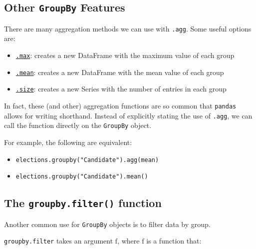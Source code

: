 \documentclass[
  letterpaper,
  DIV=11,
  numbers=noendperiod]{scrreprt}
\providecommand{\tightlist}{%
  \setlength{\itemsep}{0pt}\setlength{\parskip}{0pt}}\usepackage{longtable,booktabs,array}
\begin{document}
\hypertarget{other-groupby-features}{%
\subsection{\texorpdfstring{Other \texttt{GroupBy}
Features}{Other GroupBy Features}}\label{other-groupby-features}}

There are many aggregation methods we can use with \texttt{.agg}. Some
useful options are:

\begin{itemize}
\tightlist
\item
  \href{https://pandas.pydata.org/pandas-docs/stable/reference/api/pandas.core.groupby.GroupBy.max.html}{\texttt{.max}}:
  creates a new DataFrame with the maximum value of each group
\item
  \href{https://pandas.pydata.org/pandas-docs/stable/reference/api/pandas.core.groupby.GroupBy.mean.html}{\texttt{.mean}}:
  creates a new DataFrame with the mean value of each group
\item
  \href{https://pandas.pydata.org/pandas-docs/stable/reference/api/pandas.core.groupby.GroupBy.size.html}{\texttt{.size}}:
  creates a new Series with the number of entries in each group
\end{itemize}

In fact, these (and other) aggregation functions are so common that
\texttt{pandas} allows for writing shorthand. Instead of explicitly
stating the use of \texttt{.agg}, we can call the function directly on
the \texttt{GroupBy} object.

For example, the following are equivalent:

\begin{itemize}
\tightlist
\item
  \texttt{elections.groupby("Candidate").agg(mean)}
\item
  \texttt{elections.groupby("Candidate").mean()}
\end{itemize}

\hypertarget{the-groupby.filter-function}{%
\subsection{\texorpdfstring{The \texttt{groupby.filter()}
function}{The groupby.filter() function}}\label{the-groupby.filter-function}}

Another common use for \texttt{GroupBy} objects is to filter data by
group.

\texttt{groupby.filter} takes an argument \(\text{f}\), where
\(\text{f}\) is a function that:
\end{document}
